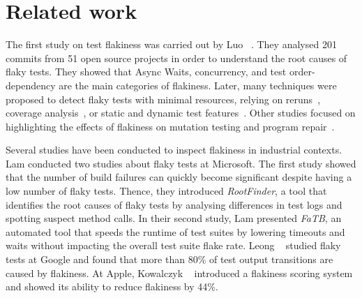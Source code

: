 \section{Related work}
\label{sec:survey-related}

The first study on test flakiness was carried out by Luo \etal~\cite{luo_empirical_2014}. 
They analysed 201 commits from 51 open source projects in order to understand the root causes of flaky tests. %
They showed that Async Waits, concurrency, and test order-dependency are the main categories of flakiness.
Later, many techniques were proposed to detect flaky tests with minimal resources, relying on reruns~\cite{lam_idflakies_2019}, coverage analysis~\cite{bell_deflaker_2018}, or static and dynamic test features~\cite{Pinto2020,alshammari2021flakeflagger,haben-msr}.
Other studies focused on highlighting the effects of flakiness on mutation testing and program repair~\cite{flakime}.


Several studies have been conducted to inspect flakiness in industrial contexts.
Lam \etal conducted two studies \cite{Lam2019RootCausing,lam_study_2020} about flaky tests at Microsoft. The first study showed that the number of build failures can quickly become significant despite having a low number of flaky tests. 
Thence, they introduced \textit{RootFinder}, a tool that identifies the root causes of flaky tests by analysing differences in test logs and spotting suspect method calls. 
In their second study, Lam \etal presented \textit{FaTB}, an automated tool that speeds the runtime of test suites by lowering timeouts and waits without impacting the overall test suite flake rate. 
Leong \etal~\cite{LeongSPTM19} studied flaky tests at Google and found that more than 80\% of test output transitions are caused by flakiness. 
At Apple, Kowalczyk \etal~\cite{Kowalczyk2020} introduced a flakiness scoring system and showed its ability to reduce flakiness by 44\%. 


